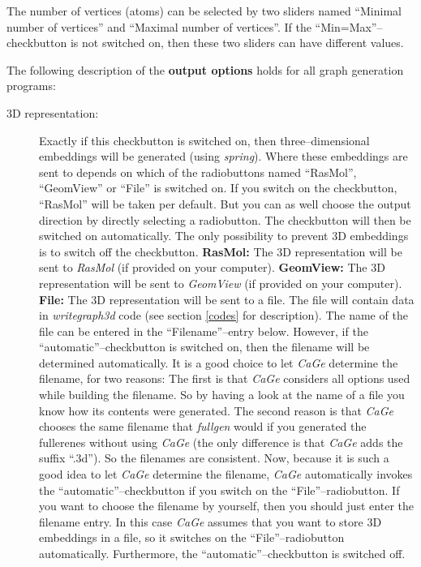 \documentclass[a4paper]{article}
\def\CaGe{\textit{CaGe}}
\begin{document}
The number of vertices (atoms) can be selected by two sliders named 
``Minimal number
of vertices'' and ``Maximal number of vertices''. If the 
``Min=Max''--checkbutton is not switched on, then these two sliders can have
different values.

The following description of the \textbf{output options} holds for all graph 
generation programs:
\begin{description}
\item[3D representation:] Exactly if this checkbutton is switched on, then 
 three--dimensional embeddings will be generated (using \textit{spring}). 
 Where these embeddings are sent to depends on which of the radiobuttons
 named ``RasMol'', ``GeomView'' or ``File'' is switched on. If you switch on
 the checkbutton, ``RasMol'' will be taken per default. But you can as well
 choose the output direction by directly selecting a radiobutton. The
 checkbutton will then be switched on automatically. The only possibility
 to prevent 3D embeddings is to switch off the checkbutton.
 \subitem\textbf{RasMol:} 
 The 3D representation will be sent to \textit{RasMol} (if provided on your 
   computer).
 \subitem\textbf{GeomView:} 
 The 3D representation will be sent to \textit{GeomView} (if provided on your
   computer).
 \subitem\textbf{File:} The 3D representation will be sent to a file.
 The file will
 contain data in \textit{writegraph3d} code (see section \ref{codes} for
 description). The name of the
 file can be entered in the ``Filename''--entry below. However, if the 
 ``automatic''--checkbutton is switched on, then the filename will be 
 determined automatically. It is a good choice to let \CaGe{} determine the
 filename, for two reasons: The first is that \CaGe{} considers all options
 used while building the filename. So by having a look at the name of a file
 you know how its contents were 
 generated. The second reason is that \CaGe{}  
 chooses the same filename that \textit{fullgen} would if you generated the
 fullerenes without using \CaGe{} (the only difference is that \CaGe{} adds
 the suffix ``.3d''). So the filenames are consistent. Now,
 because it is such a good idea to let \CaGe{} determine the filename, 
 \CaGe{} automatically invokes the ``automatic''--checkbutton if you switch
 on the ``File''--radiobutton. If you want to choose the filename by yourself,
 then you should just enter the filename entry. In this case \CaGe{} assumes
 that you want to store 3D embeddings in a file, so it switches on the 
 ``File''--radiobutton automatically. Furthermore, the
 ``automatic''--checkbutton is switched off.

\end{description}
\end{document}
